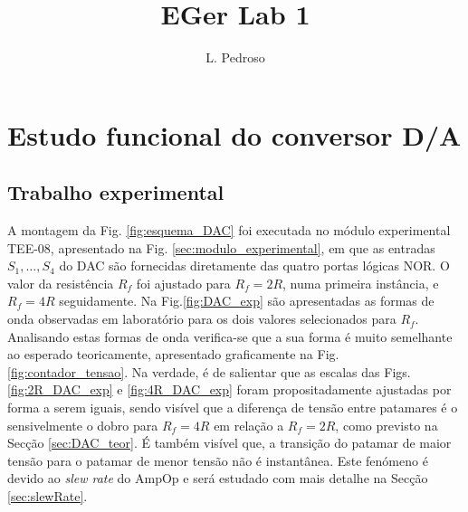 \documentclass[a4paper, oneside]{article}
\title{EGer Lab 1}
\author{L. Pedroso}
\begin{document}
\maketitle

\section{Estudo funcional do conversor D/A}
\subsection{Trabalho experimental}
A montagem da Fig. \ref{fig:esquema_DAC} foi executada  no módulo experimental TEE-08, apresentado na Fig. \ref{sec:modulo_experimental}, em que as entradas $S_1,\ldots,S_4$ do DAC são fornecidas diretamente das quatro portas lógicas NOR. O valor da resistência $R_f$ foi ajustado para $R_f = 2R$, numa primeira instância, e $R_f = 4R$ seguidamente. Na Fig.\ref{fig:DAC_exp} são apresentadas as formas de onda observadas em laboratório para os dois valores selecionados para $R_f$. Analisando estas formas de onda verifica-se que a sua forma é muito semelhante ao esperado teoricamente, apresentado graficamente na Fig. \ref{fig:contador_tensao}. Na verdade, é de salientar que as escalas das Figs.  \ref{fig:2R_DAC_exp} e \ref{fig:4R_DAC_exp} foram propositadamente ajustadas por forma a serem iguais, sendo visível que a diferença de tensão entre patamares é o sensivelmente o dobro para $R_f = 4R$ em relação a $R_f = 2R$, como previsto na Secção \ref{sec:DAC_teor}. É também visível que, a transição do patamar de maior tensão para o patamar de menor tensão não é instantânea. Este fenómeno é devido ao \textit{slew rate} do AmpOp e será estudado com mais detalhe na Secção \ref{sec:slewRate}.
\end{document}
